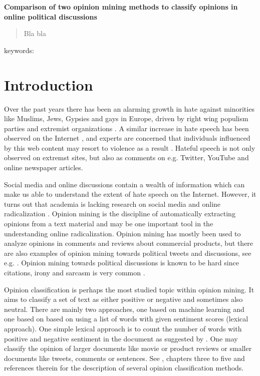 \documentclass[a4paper, 12pt]{article}
\begin{document}
\begin{center}
  \textbf{\Large{Comparison of two opinion mining methods to classify opinions in online political discussions}}

\vspace{5mm}

\end{center}

\begin{abstract}
Bla bla
\end{abstract}

keywords: \textit{}

\section{Introduction}
\label{sec:introduction}

Over the past years there has been an alarming growth in hate against minorities like Muslims, Jews, Gypsies and gays in Europe, driven by right wing populism parties and extremist organizations \citep{r4, r11}. A similar increase in hate speech has been observed on the Internet \citep{r6, s2}, and experts are concerned that individuals influenced by this web content may resort to violence as a result \citep{Strommen12, Sunde13}. Hateful speech is not only observed on extremst sites, but also as comments on e.g. Twitter, YouTube and online newspaper articles.  

Social media and online discussions contain a wealth of information which can make us able to understand the extent of hate speech on the Internet. However, it turns out that academia is lacking research on social media and online radicalization \citep{s1}. Opinion mining is the discipline of automatically extracting opinions from a text material and may be one important tool in the understanding online radicalization. Opinion mining has mostly been used to analyze opinions in comments and reviews about commercial products, but there are also examples of opinion mining towards political tweets and discussions, see e.g. \citet{Tumasjan2010, Chen10}. Opinion mining towards political discussions is known to be hard since citations, irony and sarcasm is very common \citep{Bing12}.

Opinion classification is perhaps the most studied topic within opinion mining. It aims to classify a set of text as either positive or negative and sometimes also neutral. There are mainly two approaches, one based on machine learning and one based on based on using a list of words with given sentiment scores (lexical approach). One simple lexical approach is to count the number of words with positive and negative sentiment in the document as suggested by \citet{Hu04}. One may classify the opinion of larger documents like movie or product reviews or smaller documents like tweets, comments or sentences. See \citet{Bing12}, chapters three to five and references therein for the description of several opinion classification methods. 
\end{document}
